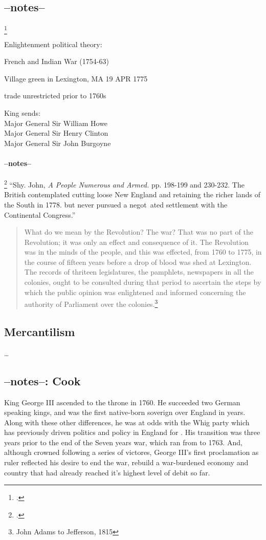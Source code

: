 \subsection{--notes--}\footcite[p. 2]{moncure_cowpens_1996}

Enlightenment political theory:

French and Indian War (1754-63)

Village green in Lexington, MA 19 APR 1775

trade unrestricted prior to 1760s

King sends:\\
Major General Sir William Howe\\
Major General Sir Henry Clinton\\
Major General Sir John Burgoyne

\paragraph{--notes--}\footcite[]{}
``Shy. John, \emph{A People Numerous and Armed.} pp. 198-199 and 230-232. The British contemplated cutting loose New England and retaining the richer lands of the South in 1778. but never pursued a negot~ated settlement with the Continental Congress.''


\begin{quotation}
  What do we mean by the Revolution? The war? That was no part of the Revolution;
  it was only an effect and consequence of it. The Revolution was in the minds of
  the people, and this was effected, from 1760 to 1775, in the course of
  fifteen years before a drop of blood was shed at Lexington. The records of
  thriteen legislatures, the pamphlets, newspapers in all the colonies, ought
  to be consulted during that period to ascertain the steps by which the public
  opinion was enlightened and informed concerning the authority of Parliament
  over the colonies.\footnote{John Adams to Jefferson, 1815}
\end{quotation}

\subsection{Mercantilism}

\ldots

\subsection{--notes--: Cook}

King George III ascended to the throne in 1760. He succeeded two German
speaking kings, and was the first native-born soverign over England in
 years. Along with these other differences, he was at odds with the
Whig party which has previously driven politics and policy in England for
. His transition was three years prior to the end of the Seven
years war, which ran from  to 1763. And, although crowned following a
series of victores, George III's first proclamation as ruler reflected his
desire to end the war, rebuild a war-burdened economy and country that had
already reached it's highest level of debit so far.


